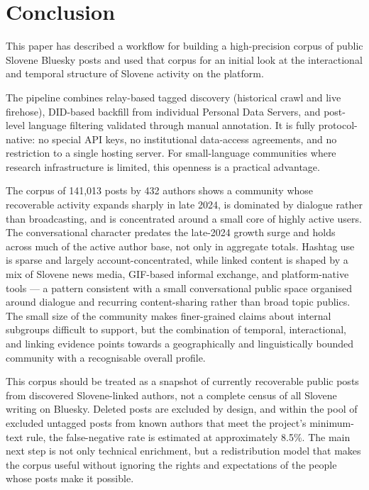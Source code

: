 \section{Conclusion}

This paper has described a workflow for building a high-precision corpus of public Slovene Bluesky posts and used that corpus for an initial look at the interactional and temporal structure of Slovene activity on the platform.

The pipeline combines relay-based tagged discovery (historical crawl and live firehose), DID-based backfill from individual Personal Data Servers, and post-level language filtering validated through manual annotation. It is fully protocol-native: no special API keys, no institutional data-access agreements, and no restriction to a single hosting server. For small-language communities where research infrastructure is limited, this openness is a practical advantage.

The corpus of 141,013 posts by 432 authors shows a community whose recoverable activity expands sharply in late 2024, is dominated by dialogue rather than broadcasting, and is concentrated around a small core of highly active users. The conversational character predates the late-2024 growth surge and holds across much of the active author base, not only in aggregate totals. Hashtag use is sparse and largely account-concentrated, while linked content is shaped by a mix of Slovene news media, GIF-based informal exchange, and platform-native tools --- a pattern consistent with a small conversational public space organised around dialogue and recurring content-sharing rather than broad topic publics. The small size of the community makes finer-grained claims about internal subgroups difficult to support, but the combination of temporal, interactional, and linking evidence points towards a geographically and linguistically bounded community with a recognisable overall profile.

This corpus should be treated as a snapshot of currently recoverable public posts from discovered Slovene-linked authors, not a complete census of all Slovene writing on Bluesky. Deleted posts are excluded by design, and within the pool of excluded untagged posts from known authors that meet the project's minimum-text rule, the false-negative rate is estimated at approximately 8.5\%. The main next step is not only technical enrichment, but a redistribution model that makes the corpus useful without ignoring the rights and expectations of the people whose posts make it possible.
